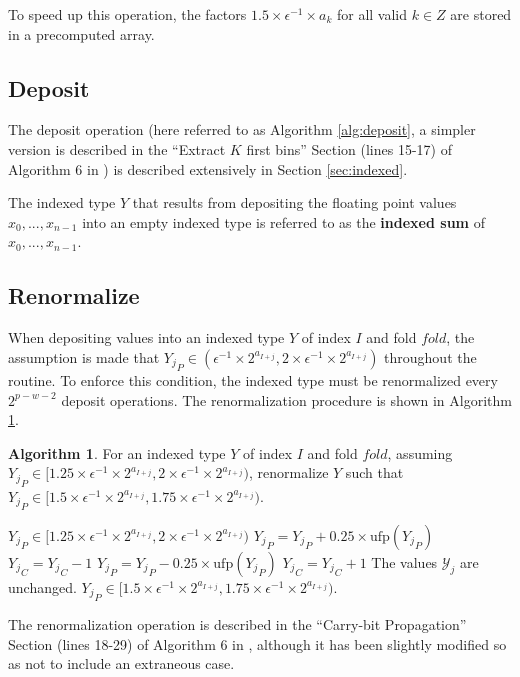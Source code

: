 \documentclass[12pt]{article}
\providecommand{\ufp}{\ensuremath{\text{ufp}}}
\providecommand{\To}{\ensuremath{\text{ to }}}
\theoremstyle{definition}
\newtheorem{alg}{Algorithm}[section]
\numberwithin{equation}{section}
\begin{document}
    To speed up this operation, the factors $1.5 \times \epsilon^{-1} \times a_k$ for all valid $k \in Z$ are stored in a precomputed array.

  \subsection{Deposit}
    \label{sec:basicops_deposit}
    The deposit operation (here referred to as Algorithm \ref{alg:deposit}, a simpler version is described in the ``Extract $K$ first bins'' Section (lines 15-17) of Algorithm $6$ in \cite{repsum}) is described extensively in Section \ref{sec:indexed}.

    The indexed type $Y$ that results from depositing the floating point values $x_0, ..., x_{n - 1}$ into an empty indexed type is referred to as the \textbf{indexed sum} of $x_0, ..., x_{n - 1}$.

  \subsection{Renormalize}
    \label{sec:basicops_renormalize}
    When depositing values into an indexed type $Y$ of index $I$ and fold $fold$, the assumption is made that ${Y_j}_P \in (\epsilon^{-1}\times 2^{a_{I + j}}, 2 \times \epsilon^{-1}\times 2^{a_{I + j}})$ throughout the routine. To enforce this condition, the indexed type must be renormalized every $2^{p - w - 2}$ deposit operations. The renormalization procedure is shown in Algorithm \ref{alg:renorm}.
    \begin{alg}
      For an indexed type $Y$ of index $I$ and fold $fold$, assuming ${Y_j}_P \in [1.25 \times \epsilon^{-1}\times 2^{a_{I + j}}, 2 \times \epsilon^{-1}\times 2^{a_{I + j}})$, renormalize $Y$ such that ${Y_j}_P \in [1.5 \times \epsilon^{-1}\times 2^{a_{I + j}}, 1.75 \times \epsilon^{-1}\times 2^{a_{I + j}})$.
      \begin{algorithmic}[1]
        \Require
          \Statex ${Y_j}_P \in [1.25 \times \epsilon^{-1}\times 2^{a_{I + j}}, 2 \times \epsilon^{-1}\times 2^{a_{I + j}})$
          \For{$j = 0 \To fold - 1$}
            \If{${Y_j}_P < 1.5 \times \ufp({Y_j}_P)$}
              \State ${Y_j}_P = {Y_j}_P + 0.25 \times \ufp({Y_j}_P)$
              \State ${Y_j}_C = {Y_j}_C - 1$
            \EndIf
            \If{${Y_j}_P \geq 1.75 \times \ufp({Y_j}_P)$}
              \State ${Y_j}_P = {Y_j}_P - 0.25 \times \ufp({Y_j}_P)$
              \State ${Y_j}_C = {Y_j}_C + 1$
            \EndIf
          \EndFor
        \EndFunction
        \Ensure
          \Statex The values $\mathcal{Y}_j$ are unchanged.
          \Statex ${Y_j}_P \in [1.5 \times \epsilon^{-1}\times 2^{a_{I + j}}, 1.75 \times \epsilon^{-1}\times 2^{a_{I + j}})$.
      \end{algorithmic}
      \label{alg:renorm}
    \end{alg}
    The renormalization operation is described in the ``Carry-bit Propagation'' Section (lines 18-29) of Algorithm $6$ in \cite{repsum}, although it has been slightly modified so as not to include an extraneous case.
\end{document}
